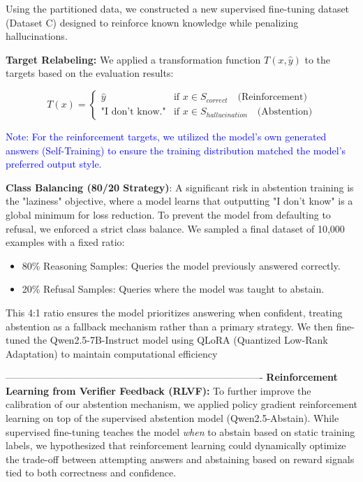 \documentclass{article}
\newcommand{\note}[1]{\textcolor{blue}{{#1}}}
\begin{document}
Using the partitioned data, we constructed a new supervised fine-tuning dataset (Dataset C) designed to reinforce known knowledge while penalizing hallucinations.

\textbf{Target Relabeling:} We applied a transformation function $T(x, \hat{y})$ to the targets based on the evaluation results:

$$T(x) =
\begin{cases}
\hat{y} & \text{if } x \in S_{correct} \quad \text{(Reinforcement)} \\
\text{"I don't know."} & \text{if } x \in S_{hallucination} \quad \text{(Abstention)}
\end{cases}$$

\note{Note: For the reinforcement targets, we utilized the model's own generated answers (Self-Training) to ensure the training distribution matched the model's preferred output style.}

\textbf{Class Balancing (80/20 Strategy)}: A significant risk in abstention training is the "laziness" objective, where a model learns that outputting "I don't know" is a global minimum for loss reduction. To prevent the model from defaulting to refusal, we enforced a strict class balance. We sampled a final dataset of 10,000 examples with a fixed ratio:
\begin{itemize}
    \item 80\% Reasoning Samples: Queries the model previously answered correctly.
    \item 20\% Refusal Samples: Queries where the model was taught to abstain.
\end{itemize}

This 4:1 ratio ensures the model prioritizes answering when confident, treating abstention as a fallback mechanism rather than a primary strategy. We then fine-tuned the Qwen2.5-7B-Instruct model using QLoRA (Quantized Low-Rank Adaptation) to maintain computational efficiency

-------------------------------------------------------------------------------\newline
\textbf{Reinforcement Learning from Verifier Feedback (RLVF):} To further improve the calibration of our abstention mechanism, we applied policy gradient reinforcement learning on top of the supervised abstention model (Qwen2.5-Abstain). While supervised fine-tuning teaches the model \textit{when} to abstain based on static training labels, we hypothesized that reinforcement learning could dynamically optimize the trade-off between attempting answers and abstaining based on reward signals tied to both correctness and confidence.
\end{document}

